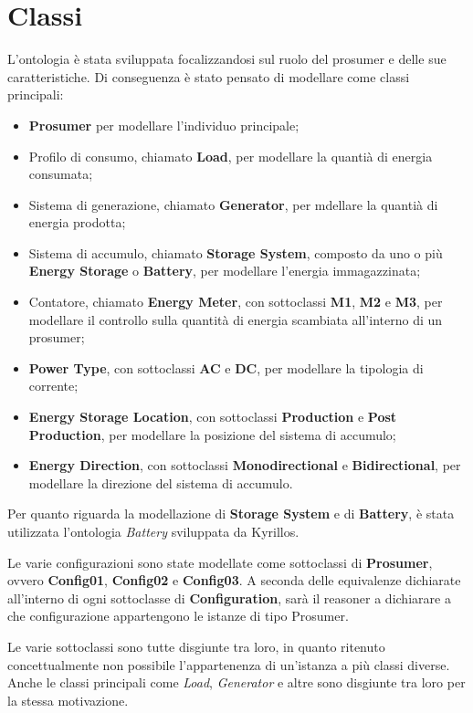 \section{Classi}
L'ontologia è stata sviluppata focalizzandosi sul ruolo del prosumer e delle sue caratteristiche.
Di conseguenza è stato pensato di modellare come classi principali:
\begin{itemize}
    \item \textbf{Prosumer} per modellare l'individuo principale;
    \item Profilo di consumo, chiamato \textbf{Load}, per modellare la quantià di energia consumata;
    \item Sistema di generazione, chiamato \textbf{Generator}, per mdellare la quantià di energia prodotta;
    \item Sistema di accumulo, chiamato \textbf{Storage System}, composto da uno o più \textbf{Energy Storage} o \textbf{Battery}, per modellare l'energia immagazzinata;
    \item Contatore, chiamato \textbf{Energy Meter}, con sottoclassi \textbf{M1}, \textbf{M2} e \textbf{M3}, per modellare il controllo sulla quantità di energia scambiata all'interno di un prosumer;
    \item \textbf{Power Type}, con sottoclassi \textbf{AC} e \textbf{DC}, per modellare la tipologia di corrente;
    \item \textbf{Energy Storage Location}, con sottoclassi \textbf{Production} e \textbf{Post Production}, per modellare la posizione del sistema di accumulo;
    \item \textbf{Energy Direction}, con sottoclassi \textbf{Monodirectional} e \textbf{Bidirectional}, per modellare la direzione del sistema di accumulo.
\end{itemize}

Per quanto riguarda la modellazione di \textbf{Storage System} e di \textbf{Battery}, è stata utilizzata l'ontologia \textit{Battery} sviluppata da Kyrillos.

Le varie configurazioni sono state modellate come sottoclassi di \textbf{Prosumer}, ovvero \textbf{Config01}, \textbf{Config02} e \textbf{Config03}.
A seconda delle equivalenze dichiarate all'interno di ogni sottoclasse di \textbf{Configuration}, sarà il reasoner a dichiarare a che configurazione appartengono le istanze di tipo Prosumer.

Le varie sottoclassi sono tutte disgiunte tra loro, in quanto ritenuto concettualmente non possibile l'appartenenza di un'istanza a più classi diverse.
Anche le classi principali come \textit{Load}, \textit{Generator} e altre sono disgiunte tra loro per la stessa motivazione.

